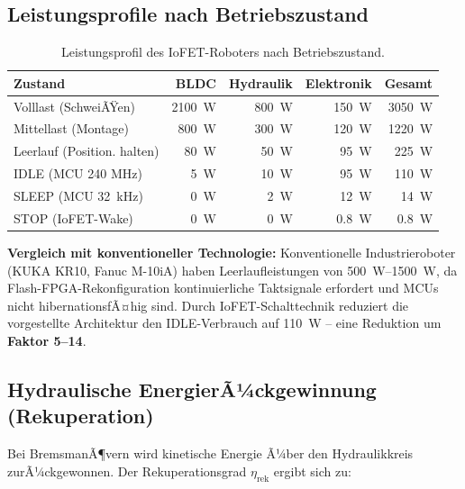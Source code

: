 ﻿\documentclass[a4paper,12pt]{scrreprt}
\theoremstyle{definition}
\begin{document}
\subsection{Leistungsprofile nach Betriebszustand}

\begin{table}[H]
\centering
\caption{Leistungsprofil des IoFET-Roboters nach Betriebszustand.}
\label{tab:power}
\small
\begin{tabular}{|l|r|r|r|r|}
\hline
\rowcolor{iofetblue!20}
\textbf{Zustand} & \textbf{BLDC} & \textbf{Hydraulik} & \textbf{Elektronik} & \textbf{Gesamt} \\
\hline
Volllast (SchweiÃŸen) & \SI{2100}{\watt} & \SI{800}{\watt} & \SI{150}{\watt} & \SI{3050}{\watt} \\
\hline
Mittellast (Montage) & \SI{800}{\watt} & \SI{300}{\watt} & \SI{120}{\watt} & \SI{1220}{\watt} \\
\hline
Leerlauf (Position. halten) & \SI{80}{\watt} & \SI{50}{\watt} & \SI{95}{\watt} & \SI{225}{\watt} \\
\hline
IDLE (MCU 240 MHz) & \SI{5}{\watt} & \SI{10}{\watt} & \SI{95}{\watt} & \SI{110}{\watt} \\
\hline
SLEEP (MCU 32~kHz) & \SI{0}{\watt} & \SI{2}{\watt} & \SI{12}{\watt} & \SI{14}{\watt} \\
\hline
STOP (IoFET-Wake) & \SI{0}{\watt} & \SI{0}{\watt} & \SI{0.8}{\watt} & \SI{0.8}{\watt} \\
\hline
\end{tabular}
\end{table}

\begin{infobox}
\textbf{Vergleich mit konventioneller Technologie:}
Konventionelle Industrieroboter (KUKA KR10, Fanuc M-10iA) haben
Leerlaufleistungen von \SI{500}{\watt}--\SI{1500}{\watt}, da
Flash-FPGA-Rekonfiguration kontinuierliche Taktsignale erfordert
und MCUs nicht hibernationsfÃ¤hig sind. Durch IoFET-Schalttechnik
reduziert die vorgestellte Architektur den IDLE-Verbrauch auf
\SI{110}{\watt} -- eine Reduktion um \textbf{Faktor 5--14}.
\end{infobox}

\subsection{Hydraulische EnergierÃ¼ckgewinnung (Rekuperation)}

Bei BremsmanÃ¶vern wird kinetische Energie Ã¼ber den Hydraulikkreis
zurÃ¼ckgewonnen. Der Rekuperationsgrad $\eta_{\text{rek}}$ ergibt sich
zu:
\end{document}
